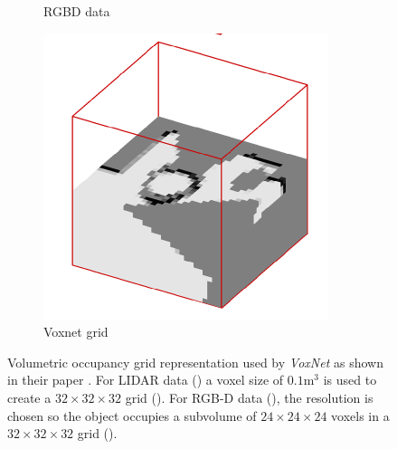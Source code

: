 \begin{figure}[!b]
\begin{subfigure}{0.23\textwidth}
		\caption{RGBD data}
		\label{subfig:objrecog:voxnet:rgbd}
	\end{subfigure}
	\hfill
	\begin{subfigure}{0.23\textwidth}
		\centering
		\includegraphics[width=\linewidth]{Figures/ObjRecog/voxnet_3}
		\caption{Voxnet grid}
		\label{subfig:objrecog:voxnet:rgbd_grid}
	\end{subfigure}
	\hfill
	\caption{Volumetric occupancy grid representation used by \emph{VoxNet} as shown in their paper \cite{Maturana2015}. For \acs{LIDAR} data () a voxel size of $0.1$m$^3$ is used to create a $32\times32\times32$ grid (). For \acs{RGB-D} data (), the resolution is chosen so the object occupies a subvolume of $24\times24\times24$ voxels in a $32\times32\times32$ grid ().}
	\label{fig:objrecog:voxnet}
\end{figure}


